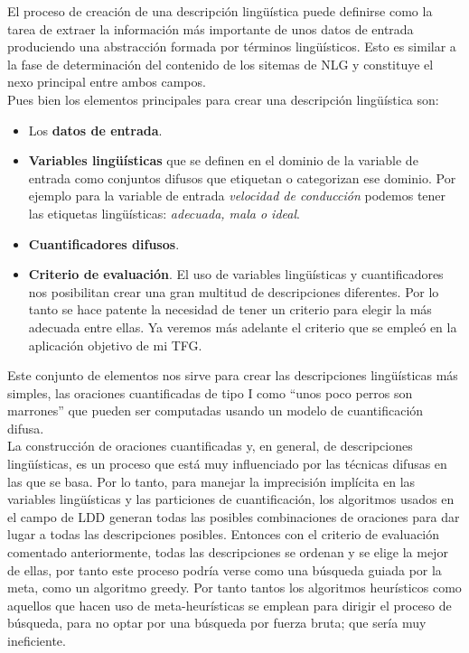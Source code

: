 \documentclass[10pt,a4paper]{article}
\begin{document}
El proceso de creación de una descripción lingüística puede definirse como la tarea de extraer la información más importante de unos datos de entrada produciendo una abstracción formada por términos lingüísticos. Esto es similar a la fase de determinación del contenido de los sitemas de NLG y constituye el nexo principal entre ambos campos.\\

Pues bien los elementos principales para crear una descripción lingüística son:

\begin{itemize}
\item Los \textbf{datos de entrada}.
\item \textbf{Variables lingüísticas} que se definen en el dominio de la variable de entrada como conjuntos difusos que etiquetan o categorizan ese dominio. Por ejemplo para la variable de entrada \textit{velocidad de conducción} podemos tener las etiquetas lingüísticas: \textit{adecuada, mala o ideal}.
\item \textbf{Cuantificadores difusos}.
\item \textbf{Criterio de evaluación}. El uso de variables lingüísticas y cuantificadores nos posibilitan crear una gran multitud de descripciones diferentes. Por lo tanto se hace patente la necesidad de tener un criterio para elegir la más adecuada entre ellas. Ya veremos más adelante el criterio que se empleó en la aplicación objetivo de mi TFG.
\end{itemize}

Este conjunto de elementos nos sirve para crear las descripciones lingüísticas más simples, las oraciones cuantificadas de tipo I como ``unos poco perros son marrones'' que pueden ser computadas usando un modelo de cuantificación difusa.\\

La construcción de oraciones cuantificadas y, en general, de descripciones lingüísticas, es un proceso que está muy influenciado por las técnicas difusas en las que se basa. Por lo tanto, para manejar la imprecisión implícita en las variables lingüísticas y las particiones de cuantificación, los algoritmos usados en el campo de LDD generan todas las posibles combinaciones de oraciones para dar lugar a todas las descripciones posibles. Entonces con el criterio de evaluación comentado anteriormente, todas las descripciones se ordenan y se elige la mejor de ellas, por tanto este proceso podría verse como una búsqueda guiada por la meta, como un algoritmo greedy. Por tanto tantos los algoritmos heurísticos como aquellos que hacen uso de meta-heurísticas se emplean para dirigir el proceso de búsqueda, para no optar por una búsqueda por fuerza bruta; que sería muy ineficiente.\\
\end{document}
